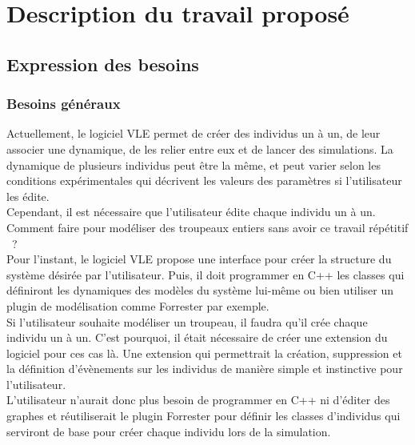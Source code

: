 \chapter{Description du travail proposé}
\setlength{\parskip}{2.5ex plus .4ex minus .4ex}

\section{Expression des besoins}
\subsection{Besoins généraux}
Actuellement, le logiciel VLE permet de créer des individus un à un, de leur associer une dynamique, de les relier entre eux et de lancer des simulations. La dynamique de plusieurs individus peut être la même, et peut varier selon les conditions expérimentales qui décrivent les valeurs des paramètres si l'utilisateur les édite.\\
Cependant, il est nécessaire que l'utilisateur édite chaque individu un à un. Comment faire pour modéliser des troupeaux entiers sans avoir ce travail répétitif ~?\\
Pour l'instant, le logiciel VLE propose une interface pour créer la structure du système désirée par l'utilisateur. Puis, il doit programmer en C++ les classes qui définiront les dynamiques des modèles du système lui-même ou bien utiliser un plugin de modélisation comme Forrester par exemple.\\
Si l'utilisateur souhaite modéliser un troupeau, il faudra qu'il crée chaque individu un à un. C'est pourquoi, il était nécessaire de créer une extension du logiciel pour ces cas là. Une extension qui permettrait la création, suppression et la définition d'évènements sur les individus de manière simple et instinctive pour l'utilisateur.\\
L'utilisateur n'aurait donc plus besoin de programmer en C++ ni d'éditer des graphes et réutiliserait le plugin Forrester pour définir les classes d'individus qui serviront de base pour créer chaque individu lors de la simulation.

